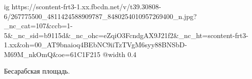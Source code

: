  
 
 
 
 

\ifcmt
  ig https://scontent-frt3-1.xx.fbcdn.net/v/t39.30808-6/267775500_4811424588909787_8480254010957269400_n.jpg?_nc_cat=107&ccb=1-5&_nc_sid=b9115d&_nc_ohc=eZqiO3FcndgAX9J21f2&_nc_ht=scontent-frt3-1.xx&oh=00_AT9bnaioq4BEbNC9iiTzTVgM6syy88BNSbD-M69M_nkOmQ&oe=61C1F215
  @width 0.4
\fi

Бесарабская площадь.
